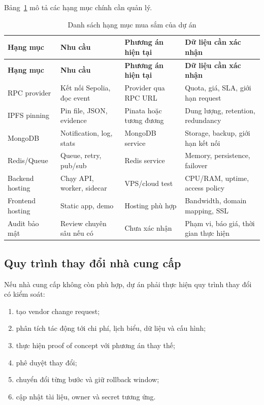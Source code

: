 Bảng~\ref{tab:procurement-items} mô tả các hạng mục chính cần quản lý.

\begin{longtable}{| p{2.6cm} | p{3cm} | p{3cm} | p{4.2cm} |}
\caption{Danh sách hạng mục mua sắm của dự án}\label{tab:procurement-items}\\
\hline
\textbf{Hạng mục} & \textbf{Nhu cầu} & \textbf{Phương án hiện tại} & \textbf{Dữ liệu cần xác nhận} \\
\hline
\endfirsthead
\hline
\textbf{Hạng mục} & \textbf{Nhu cầu} & \textbf{Phương án hiện tại} & \textbf{Dữ liệu cần xác nhận} \\
\hline
\endhead
RPC provider & Kết nối Sepolia, đọc event & Provider qua RPC URL & Quota, giá, SLA, giới hạn request \\ \hline
IPFS pinning & Pin file, JSON, evidence & Pinata hoặc tương đương & Dung lượng, retention, redundancy \\ \hline
MongoDB & Notification, log, stats & MongoDB service & Storage, backup, giới hạn kết nối \\ \hline
Redis/Queue & Queue, retry, pub/sub & Redis service & Memory, persistence, failover \\ \hline
Backend hosting & Chạy API, worker, sidecar & VPS/cloud test & CPU/RAM, uptime, access policy \\ \hline
Frontend hosting & Static app, demo & Hosting phù hợp & Bandwidth, domain mapping, SSL \\ \hline
Audit bảo mật & Review chuyên sâu nếu có & Chưa xác nhận & Phạm vi, báo giá, thời gian thực hiện \\
\hline
\end{longtable}

\iffalse
\subsection{Quy trình thay đổi nhà cung cấp}

Nếu nhà cung cấp không còn phù hợp, dự án phải thực hiện quy trình thay đổi có kiểm soát:

\begin{enumerate}
  \item tạo vendor change request;
  \item phân tích tác động tới chi phí, lịch biểu, dữ liệu và cấu hình;
  \item thực hiện proof of concept với phương án thay thế;
  \item phê duyệt thay đổi;
  \item chuyển đổi từng bước và giữ rollback window;
  \item cập nhật tài liệu, owner và secret tương ứng.
\end{enumerate}

